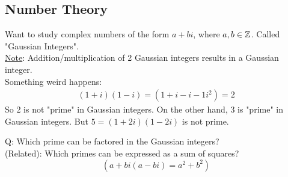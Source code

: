     \subsection{Number Theory}
    Want to study complex numbers of the form $a+bi$, where $a,b\in\mathbb{Z}$. 
    Called "Gaussian Integers". \\
    \underline{Note}: Addition/multiplication of 2 Gaussian integers results in a
    Gaussian integer. \\
    Something weird happens:
    \begin{align*}
        (1+i)(1-i) = (1+i-i-1i^2) = 2
    \end{align*}
    So 2 is not "prime" in Gaussian integers. On the other hand,
    3 is "prime" in Gaussian integers.
    But $5=(1+2i)(1-2i)$ is not prime.

    Q: Which prime can be factored in the Gaussian integers? \\
    (Related): Which primes can be expressed as a sum of squares?
    \[
        (a+bi(a-bi) = a^2+b^2)
    \]